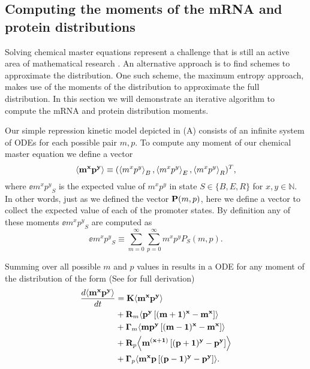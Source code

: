\subsection{Computing the moments of the mRNA and protein distributions}
\label{sec_moments}

Solving chemical master equations represent a challenge that is still an active
area of mathematical research \cite{Dinh2016}. An alternative approach is to
find schemes to approximate the distribution. One such scheme, the maximum
entropy approach, makes use of the moments of the distribution to
approximate the full distribution. In this section we will demonstrate an
iterative algorithm to compute the mRNA and protein distribution moments.

Our simple repression kinetic model depicted in (A)
consists of an infinite system of ODEs for each possible pair $m, p$. To
compute any moment of our chemical master equation we define a vector
\begin{equation}
	\left\langle \mathbf{m^x p^y} \right\rangle \equiv (\left\langle m^x p^y \right\rangle_B, \left\langle m^x p^y \right\rangle_E, \left\langle m^x p^y \right\rangle_R)^T,
\end{equation}
where $\ee{m^x p^y}_S$ is the expected value of $m^x p^y$ in state $S \in \{B,
E, R\}$ for $x, y \in \mathbb{N}$. In other words, just as we defined the vector
$\mathbf{P}(m, p)$, here we define a vector to collect the expected value of each of
the promoter states. By definition any of these moments $\ee{m^x p^y}_S$ are
computed as
\begin{equation}
  \ee{m^x p^y}_S \equiv \sum_{m=0}^\infty \sum_{p=0}^\infty m^x p^y P_S(m, p).
  \label{eq_mom_def}
\end{equation}

Summing over all possible $m$ and $p$ values in  results in
a ODE for any moment of the distribution of the form (See 
for full derivation)
\begin{equation}
  \begin{aligned}
    {d{\mathbf{\left\langle m^x p^y \right\rangle}} \over dt} &=
    \mathbf{K} \mathbf{\left\langle m^x p^y \right\rangle}\\
    &+ \mathbf{R}_m \mathbf{\left\langle p^y \left[ (m + 1)^x -m^x \right] \right\rangle}\\
    &+ \mathbf{\Gamma}_m \mathbf{\left\langle m p^y \left[ (m - 1)^x - m^x \right] \right\rangle}\\
    &+ \mathbf{R}_p \mathbf{\left\langle m^{(x + 1)} \left[ (p + 1)^y - p^y \right] \right\rangle}\\
    &+ \mathbf{\Gamma}_p \mathbf{\left\langle m^x p \left[ (p - 1)^y - p^y \right] \right\rangle}.
    \label{eq_gral_mom}
  \end{aligned}
\end{equation}

